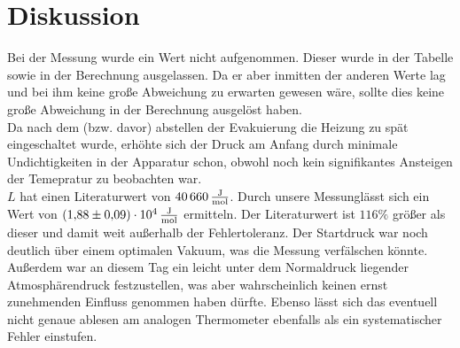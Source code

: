 \section{Diskussion}
\label{sec:Diskussion}

Bei der Messung wurde ein Wert nicht aufgenommen. Dieser wurde in der Tabelle sowie in der Berechnung ausgelassen. 
Da er aber inmitten der anderen Werte lag und bei ihm keine große Abweichung zu erwarten gewesen wäre, sollte dies keine große Abweichung in der 
Berechnung ausgelöst haben.\\
Da nach dem (bzw. davor) abstellen der Evakuierung die Heizung zu spät eingeschaltet wurde, erhöhte sich der Druck am Anfang durch 
minimale Undichtigkeiten in der Apparatur schon, obwohl noch kein signifikantes Ansteigen der Temepratur zu beobachten war.\\ \noindent
$L$ hat einen Literaturwert von $\SI{40 660}{\frac{\joule}{\mol}}$. Durch unsere Messunglässt sich ein Wert von
$\SI{1.88 +- 0.09e4}{\frac{\joule}{\mol}}$ ermitteln. Der Literaturwert ist $116\%$ größer als dieser und damit weit außerhalb der Fehlertoleranz. \noindent
Der Startdruck war noch deutlich über einem optimalen Vakuum, was die Messung  verfälschen könnte. Außerdem war an diesem Tag ein leicht unter dem
Normaldruck liegender Atmosphärendruck festzustellen, was aber wahrscheinlich keinen ernst zunehmenden Einfluss genommen haben dürfte. Ebenso lässt sich das eventuell nicht genaue
ablesen am analogen Thermometer ebenfalls als ein systematischer Fehler einstufen.
